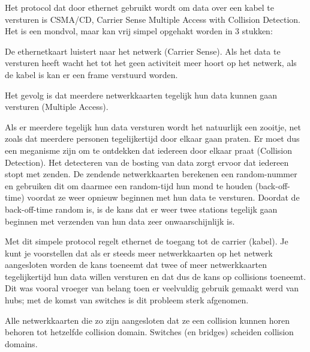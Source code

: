 Het protocol dat door ethernet gebruikt wordt om data over een kabel te versturen is CSMA/CD, Carrier Sense Multiple Access with Collision Detection. Het is een mondvol, maar kan vrij simpel opgehakt worden in 3 stukken:

De ethernetkaart luistert naar het netwerk (Carrier Sense). Als het data te versturen heeft wacht het tot het geen activiteit meer hoort op het netwerk, als de kabel  is kan er een frame verstuurd worden.

Het gevolg is dat meerdere netwerkkaarten tegelijk hun data kunnen gaan versturen (Multiple Access).

Als er meerdere tegelijk hun data versturen wordt het natuurlijk een zooitje, net zoals dat meerdere personen tegelijkertijd door elkaar gaan praten. Er moet dus een meganisme zijn om te ontdekken dat iedereen door elkaar praat (Collision Detection). Het detecteren van de bosting van data zorgt ervoor dat iedereen stopt met zenden. De zendende netwerkkaarten berekenen een random-nummer en gebruiken dit om daarmee een random-tijd hun mond te houden (back-off-time) voordat ze weer opnieuw beginnen met hun data te versturen. Doordat de back-off-time random is, is de kans dat er weer twee stations tegelijk gaan beginnen met verzenden van hun data zeer onwaarschijnlijk is.

Met dit simpele protocol regelt ethernet de toegang tot de carrier (kabel). Je kunt je voorstellen dat als er steeds meer netwerkkaarten op het netwerk aangesloten worden de kans toeneemt dat twee of meer netwerkkaarten tegelijkertijd hun data willen versturen en dat dus de kans op collisions toeneemt. Dit was vooral vroeger van belang toen er veelvuldig gebruik gemaakt werd van hubs; met de komst van switches is dit probleem sterk afgenomen.

Alle netwerkkaarten die zo zijn aangesloten dat ze een collision kunnen horen behoren tot hetzelfde collision domain. Switches (en bridges) scheiden collision domains.
